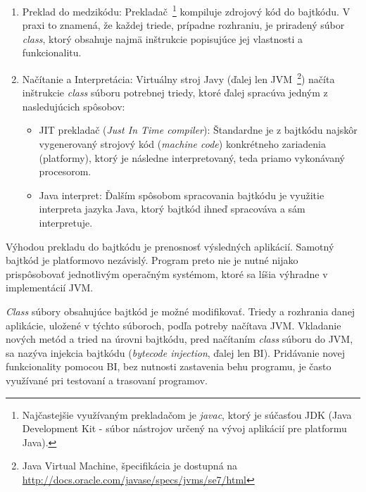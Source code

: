 \documentclass[11pt,final,oneside]{fithesis}
\begin{document}
\begin{enumerate}
\item Preklad do medzikódu: Prekladač~\footnote{Najčastejšie využívaným
prekladačom je \textit{javac}, ktorý je súčasťou JDK (Java Development
Kit - súbor nástrojov určený na vývoj aplikácií pre platformu Java).}
kompiluje zdrojový kód do bajtkódu. V praxi to znamená, že každej triede, 
prípadne rozhraniu, je priradený súbor \textit{class}, ktorý obsahuje najmä 
inštrukcie popisujúce jej vlastnosti a funkcionalitu. 
\item Načítanie a Interpretácia: Virtuálny
stroj Javy (ďalej len JVM~\footnote{Java Virtual Machine, špecifikácia je
dostupná na \url{http://docs.oracle.com/javase/specs/jvms/se7/html}}) načíta
inštrukcie \textit{class} súboru potrebnej triedy, ktoré ďalej spracúva jedným
z nasledujúcich spôsobov:

\begin{itemize}
\item JIT prekladač (\textit{Just In Time compiler}): Štandardne je z
bajtkódu najskôr vygenerovaný strojový kód (\textit{machine code}) konkrétneho
zariadenia (platformy), ktorý je následne interpretovaný, teda priamo 
vykonávaný procesorom.
\item Java interpret: Ďalším spôsobom spracovania bajtkódu je
využitie interpreta jazyka Java, ktorý bajtkód ihneď spracováva a sám
interpretuje.
\end{itemize}
\end{enumerate}

Výhodou prekladu do bajtkódu je prenosnosť výsledných aplikácií.
Samotný bajtkód je platformovo nezávislý. Program preto nie je nutné nijako
prispôsobovať jednotlivým operačným systémom, ktoré sa líšia výhradne v 
implementácií JVM.

\textit{Class} súbory obsahujúce bajtkód je možné modifikovať.
Triedy a rozhrania danej aplikácie, uložené v týchto súboroch, podľa 
potreby načítava JVM. Vkladanie nových metód a tried na úrovni bajtkódu, pred
načítaním \textit{class} súboru do JVM, sa nazýva injekcia bajtkódu
(\textit{bytecode injection}, ďalej len BI). Pridávanie novej funkcionality
pomocou BI, bez nutnosti zastavenia behu programu, je často využívané pri
testovaní a trasovaní programov.
\end{document}
